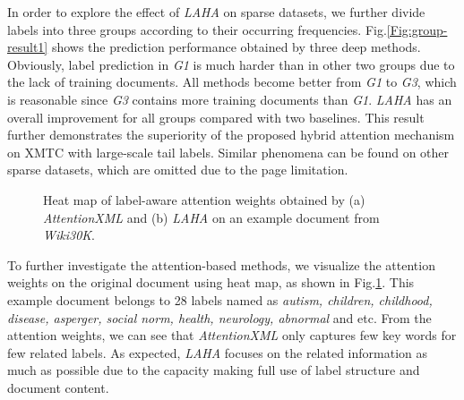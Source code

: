 \documentclass[runningheads]{llncs}
\begin{document}
In order to explore the effect of \textit{LAHA} on sparse datasets, we further divide labels into three groups according to their occurring frequencies. Fig.\ref{Fig:group-result1} shows the prediction performance obtained by three deep methods. Obviously, label prediction in \textit{G1} is much harder than in other two groups due to the lack of training documents.
All methods become better from \textit{G1} to \textit{G3}, which is reasonable since \textit{G3} contains more training documents than \textit{G1}.  \textit{LAHA} has an overall improvement for all groups compared with two baselines. This result further demonstrates the superiority of the proposed hybrid attention mechanism on XMTC with large-scale tail labels. Similar phenomena can be found on other sparse datasets, which are omitted due to the page limitation.
\hspace{-2mm}
{\small 
\begin{figure}[h]
	\centering
	\setlength{\abovecaptionskip}{0.cm}
	\setlength{\belowcaptionskip}{-0.cm}
	\caption{Heat map of label-aware attention weights obtained by (a) \textit{AttentionXML} and (b) \textit{LAHA} on an example document from \textit{Wiki30K}.}\label{Fig:heat-map} 
\end{figure}
}

To further investigate the attention-based methods, we visualize the attention weights on the original document using heat map, as shown in Fig.\ref{Fig:heat-map}. This example document belongs to 28 labels named as \textit{autism, children, childhood, disease, asperger, social norm, health, neurology, abnormal} and etc. From the attention weights, we can see that \textit{AttentionXML} only captures few key words for few related labels. As expected, \textit{LAHA} focuses on the related information as much as possible due to the capacity making full use of label structure and document content. 
\end{document}
